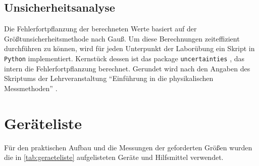 \documentclass[ngerman]{scrartcl}
\begin{document}
\subsection{Unsicherheitsanalyse}
\label{subsec:unsicherheitsanalyse}

Die Fehlerfortpflanzung der berechneten Werte basiert auf der Größtunsicherheitsmethode nach Gauß. Um diese Berechnungen zeiteffizient durchführen zu können, wird für jeden Unterpunkt der Laborübung ein Skript in \verb!Python! implementiert. Kernstück dessen ist das package \verb!uncertainties! \cite{ref:uncertainties}, das intern die Fehlerfortpflanzung berechnet. Gerundet wird nach den Angaben des Skriptums der Lehrveranstaltung \enquote{Einführung in die physikalischen Messmethoden} \cite{ref:messmethoden}.

\clearpage

\section{Geräteliste}
\label{sec:geraeteliste}

Für den praktischen Aufbau und die Messungen der geforderten Größen wurden die in \autoref{tab:geraeteliste} aufgelisteten Geräte und Hilfsmittel verwendet.
\end{document}
